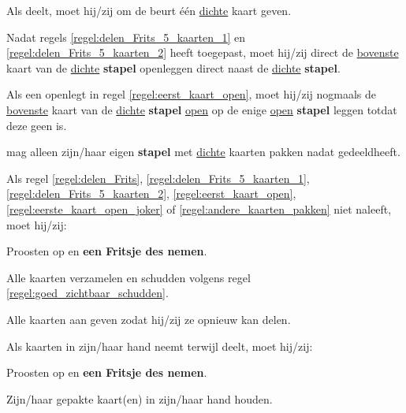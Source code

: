 \vervolgLijst{}
    \item Als \Frits deelt\footnotemark[1], moet hij/zij \alleSpelers om de beurt één \ul{dichte} kaart geven.
    \label{regel:delen_Frits_5_kaarten_2}
\eindLijst{}

\vervolgLijst{}
    \item Nadat \Frits regels \ref{regel:delen_Frits_5_kaarten_1} en \ref{regel:delen_Frits_5_kaarten_2} heeft toegepast, moet hij/zij direct de \ul{bovenste} kaart van de \ul{dichte} \textbf{stapel} openleggen direct naast de \ul{dichte} \textbf{stapel}.
    \label{regel:eerst_kaart_open}
\eindLijst{}   

\vervolgLijst{}
    \item Als \Frits een \footnotemark[2] openlegt in regel \ref{regel:eerst_kaart_open}, moet hij/zij nogmaals de \ul{bovenste} kaart van de \ul{dichte} \textbf{stapel} \ul{open} op de enige \ul{open} \textbf{stapel} leggen totdat deze geen \footnotemark[2] is.
    \label{regel:eerste_kaart_open_joker}
\eindLijst{}   

\vervolgLijst{}
    \item \EenSpeler mag alleen zijn/haar eigen \textbf{stapel} met \ul{dichte} kaarten pakken nadat \Frits gedeeld\footnotemark[1] heeft.
   \label{regel:andere_kaarten_pakken}
\eindLijst{}

\vervolgLijst{}
    \item Als \eenSpeler regel \ref{regel:delen_Frits}, \ref{regel:delen_Frits_5_kaarten_1}, \ref{regel:delen_Frits_5_kaarten_2}, \ref{regel:eerst_kaart_open}, \ref{regel:eerste_kaart_open_joker} of \ref{regel:andere_kaarten_pakken} niet naleeft, moet hij/zij:
    \puntLijst{}
        \item Proosten op  en \textbf{een Fritsje des nemen}\footnotemark[3].
        \item Alle kaarten verzamelen en schudden volgens regel \ref{regel:goed_zichtbaar_schudden}.
        \item Alle kaarten aan \Frits geven zodat hij/zij ze opnieuw kan delen.
    \eindPuntLijst{}
\eindLijst{}

\vervolgLijst{}
    \item Als \eenSpeler kaarten in zijn/haar hand neemt terwijl \Frits deelt\footnotemark[1], moet hij/zij:
     \puntLijst{}
         \item Proosten op  en \textbf{een Fritsje des nemen}\footnotemark[3].
         \item Zijn/haar gepakte kaart(en) in zijn/haar hand houden.
     \eindPuntLijst{}
\eindLijst{}

